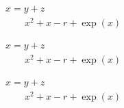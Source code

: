 \documentclass[a4paper,12pt]{article}
\begin{document}
\begin{equation}
  \begin{aligned}
    &x = y + z \\
    &\qquad x^2 + x - r + \exp(x) 
  \end{aligned}
\end{equation}

\begin{align}
    &x = y + z \nonumber\\
    &\qquad x^2 + x - r + \exp(x) 
\end{align}

\begin{align}
  &x = y + z \nonumber\\
  &\text{}\qquad x^2 + x - r + \exp(x) 
\end{align}
\end{document}
